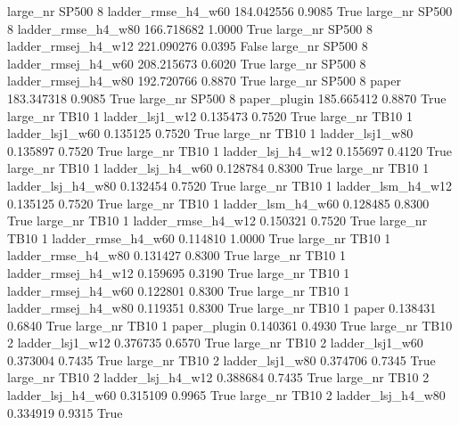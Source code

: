   large_nr    SP500                 8  ladder_rmse_h4_w60  184.042556      0.9085    True
  large_nr    SP500                 8  ladder_rmse_h4_w80  166.718682      1.0000    True
  large_nr    SP500                 8 ladder_rmsej_h4_w12  221.090276      0.0395   False
  large_nr    SP500                 8 ladder_rmsej_h4_w60  208.215673      0.6020    True
  large_nr    SP500                 8 ladder_rmsej_h4_w80  192.720766      0.8870    True
  large_nr    SP500                 8               paper  183.347318      0.9085    True
  large_nr    SP500                 8        paper_plugin  185.665412      0.8870    True
  large_nr     TB10                 1     ladder_lsj1_w12    0.135473      0.7520    True
  large_nr     TB10                 1     ladder_lsj1_w60    0.135125      0.7520    True
  large_nr     TB10                 1     ladder_lsj1_w80    0.135897      0.7520    True
  large_nr     TB10                 1   ladder_lsj_h4_w12    0.155697      0.4120    True
  large_nr     TB10                 1   ladder_lsj_h4_w60    0.128784      0.8300    True
  large_nr     TB10                 1   ladder_lsj_h4_w80    0.132454      0.7520    True
  large_nr     TB10                 1   ladder_lsm_h4_w12    0.135125      0.7520    True
  large_nr     TB10                 1   ladder_lsm_h4_w60    0.128485      0.8300    True
  large_nr     TB10                 1  ladder_rmse_h4_w12    0.150321      0.7520    True
  large_nr     TB10                 1  ladder_rmse_h4_w60    0.114810      1.0000    True
  large_nr     TB10                 1  ladder_rmse_h4_w80    0.131427      0.8300    True
  large_nr     TB10                 1 ladder_rmsej_h4_w12    0.159695      0.3190    True
  large_nr     TB10                 1 ladder_rmsej_h4_w60    0.122801      0.8300    True
  large_nr     TB10                 1 ladder_rmsej_h4_w80    0.119351      0.8300    True
  large_nr     TB10                 1               paper    0.138431      0.6840    True
  large_nr     TB10                 1        paper_plugin    0.140361      0.4930    True
  large_nr     TB10                 2     ladder_lsj1_w12    0.376735      0.6570    True
  large_nr     TB10                 2     ladder_lsj1_w60    0.373004      0.7435    True
  large_nr     TB10                 2     ladder_lsj1_w80    0.374706      0.7345    True
  large_nr     TB10                 2   ladder_lsj_h4_w12    0.388684      0.7435    True
  large_nr     TB10                 2   ladder_lsj_h4_w60    0.315109      0.9965    True
  large_nr     TB10                 2   ladder_lsj_h4_w80    0.334919      0.9315    True

